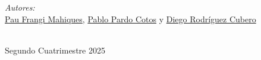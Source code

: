 \documentclass[a4paper,11pt,final]{article}
\begin{document}
\begin{titlepage}
    
    \vspace{0.5cm}
    \begin{minipage}{0.7\textwidth}
    \begin{flushleft} \large
    \emph{Autores:}\\
    \href{https://github.com/Pau-Frangi}{Pau Frangi Mahiques}, \href{https://github.com/PabloPC05}{Pablo Pardo Cotos} y \href{https://github.com/DIEGOROCU}{Diego Rodríguez Cubero}\\
    \end{flushleft}
    
    \end{minipage}\\[2cm]
    

    
    Segundo Cuatrimestre 2025
    \vfill %

\end{titlepage}

\newpage
\tableofcontents
\newpage


\end{document}
